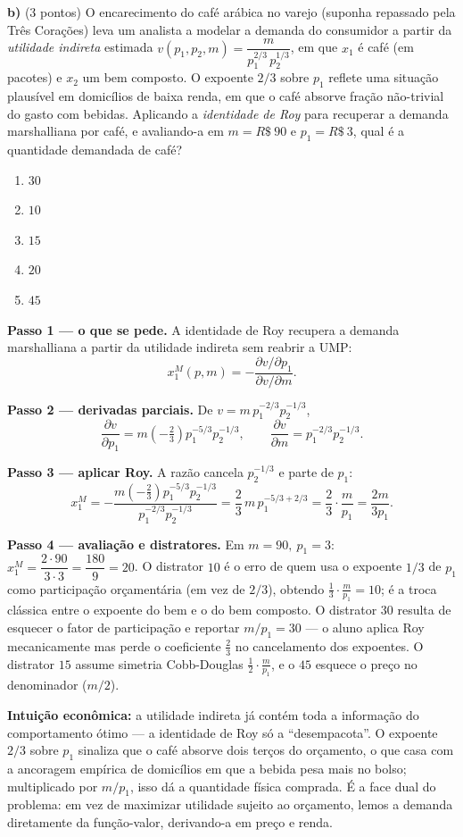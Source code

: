 \textbf{b)} (3 pontos) O encarecimento do café arábica no varejo (suponha repassado pela Três Corações) leva um analista a modelar a demanda do consumidor a partir da \emph{utilidade indireta} estimada $v(p_1,p_2,m)=\dfrac{m}{p_1^{2/3}\,p_2^{1/3}}$, em que $x_1$ é café (em pacotes) e $x_2$ um bem composto. O expoente $2/3$ sobre $p_1$ reflete uma situação plausível em domicílios de baixa renda, em que o café absorve fração não-trivial do gasto com bebidas. Aplicando a \emph{identidade de Roy} para recuperar a demanda marshalliana por café, e avaliando-a em $m=R\$~90$ e $p_1=R\$~3$, qual é a quantidade demandada de café?

\begin{enumerate}[label=\Alph*., leftmargin=3.2em, itemsep=0.05em, topsep=0.1em]
  \item $30$
  \item $10$
  \item $15$
  \item $20$
  \item $45$
\end{enumerate}
\begin{solucao}
\textbf{Passo 1 --- o que se pede.} A identidade de Roy recupera a demanda marshalliana a partir da utilidade indireta sem reabrir a UMP:
\[
x_1^{M}(p,m)=-\frac{\partial v/\partial p_1}{\partial v/\partial m}.
\]

\textbf{Passo 2 --- derivadas parciais.} De $v=m\,p_1^{-2/3}p_2^{-1/3}$,
\[
\frac{\partial v}{\partial p_1}=m\left(-\tfrac23\right)p_1^{-5/3}p_2^{-1/3},\qquad \frac{\partial v}{\partial m}=p_1^{-2/3}p_2^{-1/3}.
\]

\textbf{Passo 3 --- aplicar Roy.} A razão cancela $p_2^{-1/3}$ e parte de $p_1$:
\[
x_1^{M}=-\frac{m\left(-\tfrac23\right)p_1^{-5/3}p_2^{-1/3}}{p_1^{-2/3}p_2^{-1/3}}=\frac23\,m\,p_1^{-5/3+2/3}=\frac23\cdot\frac{m}{p_1}=\frac{2m}{3p_1}.
\]

\textbf{Passo 4 --- avaliação e distratores.} Em $m=90,\ p_1=3$: $x_1^{M}=\dfrac{2\cdot 90}{3\cdot 3}=\dfrac{180}{9}=20$. O distrator $10$ é o erro de quem usa o expoente $1/3$ de $p_1$ como participação orçamentária (em vez de $2/3$), obtendo $\tfrac13\cdot\tfrac{m}{p_1}=10$; é a troca clássica entre o expoente do bem e o do bem composto. O distrator $30$ resulta de esquecer o fator de participação e reportar $m/p_1=30$ --- o aluno aplica Roy mecanicamente mas perde o coeficiente $\tfrac23$ no cancelamento dos expoentes. O distrator $15$ assume simetria Cobb-Douglas $\tfrac12\cdot\tfrac{m}{p_1}$, e o $45$ esquece o preço no denominador ($m/2$).

\textbf{Intuição econômica:} a utilidade indireta já contém toda a informação do comportamento ótimo --- a identidade de Roy só a ``desempacota''. O expoente $2/3$ sobre $p_1$ sinaliza que o café absorve dois terços do orçamento, o que casa com a ancoragem empírica de domicílios em que a bebida pesa mais no bolso; multiplicado por $m/p_1$, isso dá a quantidade física comprada. É a face dual do problema: em vez de maximizar utilidade sujeito ao orçamento, lemos a demanda diretamente da função-valor, derivando-a em preço e renda.
\end{solucao}

